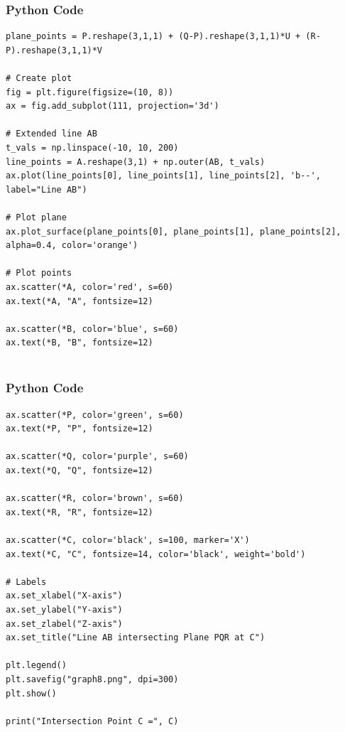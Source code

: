 \documentclass{beamer}
\begin{document}
\begin{frame}[fragile]
    \frametitle{Python Code }

    \begin{lstlisting}
plane_points = P.reshape(3,1,1) + (Q-P).reshape(3,1,1)*U + (R-P).reshape(3,1,1)*V

# Create plot
fig = plt.figure(figsize=(10, 8))
ax = fig.add_subplot(111, projection='3d')

# Extended line AB
t_vals = np.linspace(-10, 10, 200)
line_points = A.reshape(3,1) + np.outer(AB, t_vals)
ax.plot(line_points[0], line_points[1], line_points[2], 'b--', label="Line AB")

# Plot plane
ax.plot_surface(plane_points[0], plane_points[1], plane_points[2], alpha=0.4, color='orange')

# Plot points
ax.scatter(*A, color='red', s=60)
ax.text(*A, "A", fontsize=12)

ax.scatter(*B, color='blue', s=60)
ax.text(*B, "B", fontsize=12)


    \end{lstlisting}
\end{frame}

\begin{frame}[fragile]
    \frametitle{Python Code}

    \begin{lstlisting}
ax.scatter(*P, color='green', s=60)
ax.text(*P, "P", fontsize=12)

ax.scatter(*Q, color='purple', s=60)
ax.text(*Q, "Q", fontsize=12)

ax.scatter(*R, color='brown', s=60)
ax.text(*R, "R", fontsize=12)

ax.scatter(*C, color='black', s=100, marker='X')
ax.text(*C, "C", fontsize=14, color='black', weight='bold')

# Labels
ax.set_xlabel("X-axis")
ax.set_ylabel("Y-axis")
ax.set_zlabel("Z-axis")
ax.set_title("Line AB intersecting Plane PQR at C")

plt.legend()
plt.savefig("graph8.png", dpi=300)
plt.show()

print("Intersection Point C =", C)



  \end{lstlisting}
\end{frame}
\end{document}

